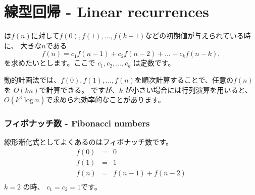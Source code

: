 \section{線型回帰 - Linear recurrences}


は$f(n)$に対して$f(0),f(1),\ldots,f(k-1)$などの初期値が与えられている時に、
大きな$n$である
\[f(n) = c_1 f(n-1) + c_2 f(n-2) + \ldots + c_k f (n-k),\]
を求めたいとします。ここで $c_1,c_2,\ldots,c_k$ は定数です。

動的計画法では、$f(0),f(1),\ldots,f(n)$を順次計算することで、任意の$f(n)$を $O(kn)$で計算できる。
ですが、$k$ が小さい場合には行列演算を用いると、$O(k^3 \log n)$で求められ効率的なことがあります。

\subsubsection{フィボナッチ数 - Fibonacci numbers}


線形漸化式としてよくあるのはフィボナッチ数です。
\[
\begin{array}{lcl}
f(0) & = & 0 \\
f(1) & = & 1 \\
f(n) & = & f(n-1)+f(n-2) \\
\end{array}
\]
$k=2$ の時、 $c_1=c_2=1$です。


